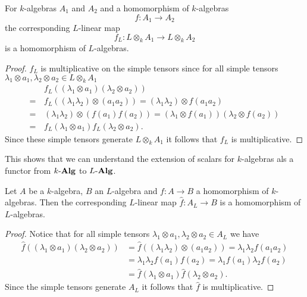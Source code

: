 \begin{lem}
  For $k$-algebras $A_1$ and $A_2$ and a homomorphism of $k$-algebras
  \[
    f \colon A_1 \to A_2
  \]
  the corresponding $L$-linear map
  \[
            f_L
    \colon  L \otimes_k A_1
    \to     L \otimes_k A_2
  \]
  is a homomorphism of $L$-algebras.
\end{lem}
\begin{proof}
  $f_L$ is multiplicative on the simple tensors since for all simple tensors $\lambda_1 \otimes a_1, \lambda_2 \otimes a_2 \in L \otimes_k A_1$
  \begin{align*}
     &\,  f_L((\lambda_1 \otimes a_1)(\lambda_2 \otimes a_2))   \\
    =&\,  f_L((\lambda_1 \lambda_2) \otimes (a_1 a_2))
    =     (\lambda_1 \lambda_2) \otimes f(a_1 a_2) \\
    =&\,  (\lambda_1 \lambda_2) \otimes (f(a_1)f(a_2))
    =     (\lambda_1 \otimes f(a_1)) (\lambda_2 \otimes f(a_2)) \\
    =&\,  f_L(\lambda_1 \otimes a_1) f_L(\lambda_2 \otimes a_2).
  \end{align*}
  Since these simple tensors generate $L \otimes_k A_1$ it follows that $f_L$ is multiplicative.
\end{proof}
  
  
This shows that we can understand the extension of scalars for $k$-algebras als a functor from $k\text{-}\mathbf{Alg}$ to $L\text{-}\mathbf{Alg}$.


\begin{lem}
  Let $A$ be a $k$-algebra, $B$ an $L$-algebra and $f \colon A \to B$ a homomorphism of $k$-algebras.
  Then the corresponding $L$-linear map $\hat{f} \colon A_L \to B$ is a homomorphism of $L$-algebras.
  \begin{proof}
  Notice that for all simple tensors $\lambda_1 \otimes a_1, \lambda_2 \otimes a_2 \in A_L$ we have
    \begin{align*}
          \hat{f}((\lambda_1 \otimes a_1)(\lambda_2 \otimes a_2))
      &=  \hat{f}((\lambda_1 \lambda_2) \otimes (a_1 a_2))
       =  \lambda_1 \lambda_2 f(a_1 a_2)    \\
      &=  \lambda_1 \lambda_2 f(a_1) f(a_2)
       =  \lambda_1 f(a_1) \lambda_2 f(a_2) \\
      &=  \hat{f}(\lambda_1 \otimes a_1) \hat{f}(\lambda_2 \otimes a_2).
    \end{align*}
    Since the simple tensors generate $A_L$ it follows that $\hat{f}$ is multiplicative.
  \end{proof}
\end{lem}


